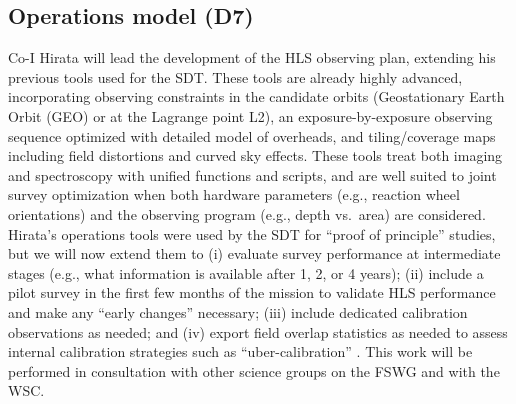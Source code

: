 
\subsection{Operations model (D7)}

Co-I Hirata will lead the development of the HLS observing plan,
extending his previous tools used for the SDT. These tools are already
highly advanced, incorporating observing constraints in the candidate
orbits (Geostationary Earth Orbit (GEO) or at the Lagrange point L2),
an exposure-by-exposure observing sequence optimized
with detailed model of overheads, and tiling/coverage maps including
field distortions and curved sky effects. These tools treat both imaging
and spectroscopy with unified functions and scripts, and are well suited to joint survey optimization when
both hardware parameters (e.g., reaction wheel orientations) and the
observing program (e.g., depth vs.\ area) are considered.
Hirata's operations tools were
used by the SDT for ``proof of principle'' studies, but we will now
extend them to (i) evaluate survey performance at intermediate stages
(e.g., what information is available after 1, 2, or 4 years); (ii)
include a pilot survey in the first few months of the mission to
validate HLS performance and make any ``early changes'' necessary;
(iii) include dedicated calibration observations as needed; and (iv)
export field overlap statistics as needed to assess internal calibration
strategies such as ``uber-calibration'' \cite{Padmanabhan2008}. This work will
be performed in consultation with other science groups on the FSWG and with
the WSC.

